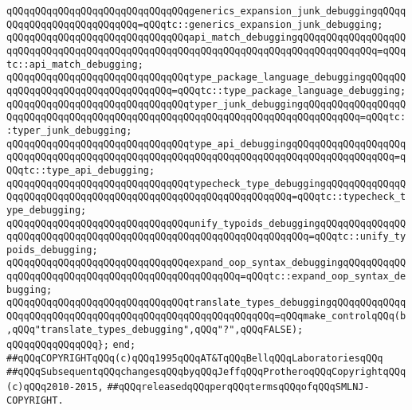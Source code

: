 \verb|qQQqqQQqqQQqqQQqqQQqqQQqqQQqqQQqgenerics_expansion_junk_debuggingqQQqqQQqqQQqqQQqqQQqqQQqqQQq=qQQqtc::generics_expansion_junk_debugging;|\newline
\verb|qQQqqQQqqQQqqQQqqQQqqQQqqQQqqQQqapi_match_debuggingqQQqqQQqqQQqqQQqqQQqqQQqqQQqqQQqqQQqqQQqqQQqqQQqqQQqqQQqqQQqqQQqqQQqqQQqqQQqqQQqqQQq=qQQqtc::api_match_debugging;|\newline
\verb|qQQqqQQqqQQqqQQqqQQqqQQqqQQqqQQqtype_package_language_debuggingqQQqqQQqqQQqqQQqqQQqqQQqqQQqqQQqqQQq=qQQqtc::type_package_language_debugging;|\newline
\newline
\verb|qQQqqQQqqQQqqQQqqQQqqQQqqQQqqQQqtyper_junk_debuggingqQQqqQQqqQQqqQQqqQQqqQQqqQQqqQQqqQQqqQQqqQQqqQQqqQQqqQQqqQQqqQQqqQQqqQQqqQQqqQQq=qQQqtc::typer_junk_debugging;|\newline
\verb|qQQqqQQqqQQqqQQqqQQqqQQqqQQqqQQqtype_api_debuggingqQQqqQQqqQQqqQQqqQQqqQQqqQQqqQQqqQQqqQQqqQQqqQQqqQQqqQQqqQQqqQQqqQQqqQQqqQQqqQQqqQQqqQQq=qQQqtc::type_api_debugging;|\newline
\verb|qQQqqQQqqQQqqQQqqQQqqQQqqQQqqQQqtypecheck_type_debuggingqQQqqQQqqQQqqQQqqQQqqQQqqQQqqQQqqQQqqQQqqQQqqQQqqQQqqQQqqQQqqQQq=qQQqtc::typecheck_type_debugging;|\newline
\newline
\verb|qQQqqQQqqQQqqQQqqQQqqQQqqQQqqQQqunify_typoids_debuggingqQQqqQQqqQQqqQQqqQQqqQQqqQQqqQQqqQQqqQQqqQQqqQQqqQQqqQQqqQQqqQQqqQQq=qQQqtc::unify_typoids_debugging;|\newline
\verb|qQQqqQQqqQQqqQQqqQQqqQQqqQQqqQQqexpand_oop_syntax_debuggingqQQqqQQqqQQqqQQqqQQqqQQqqQQqqQQqqQQqqQQqqQQqqQQqqQQq=qQQqtc::expand_oop_syntax_debugging;|\newline
\verb|qQQqqQQqqQQqqQQqqQQqqQQqqQQqqQQqtranslate_types_debuggingqQQqqQQqqQQqqQQqqQQqqQQqqQQqqQQqqQQqqQQqqQQqqQQqqQQqqQQqqQQq=qQQqmake_controlqQQq(b,qQQq"translate_types_debugging",qQQq"?",qQQqFALSE);|\newline
\verb|qQQqqQQqqQQqqQQq};|\newline
\verb|end;|\newline
\newline
\verb|##qQQqCOPYRIGHTqQQq(c)qQQq1995qQQqAT&TqQQqBellqQQqLaboratoriesqQQq|\newline
\verb|##qQQqSubsequentqQQqchangesqQQqbyqQQqJeffqQQqProtheroqQQqCopyrightqQQq(c)qQQq2010-2015,|\newline
\verb|##qQQqreleasedqQQqperqQQqtermsqQQqofqQQqSMLNJ-COPYRIGHT.|\newline
\newline

